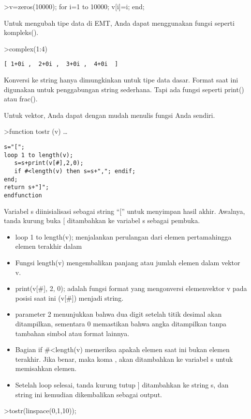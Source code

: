 \documentclass[
]{book}
\begin{document}
\textgreater v=zeros(10000); for i=1 to 10000; v{[}i{]}=i; end;

Untuk mengubah tipe data di EMT, Anda dapat menggunakan fungsi seperti kompleks().

\textgreater complex(1:4)

\begin{verbatim}
[ 1+0i ,  2+0i ,  3+0i ,  4+0i  ]
\end{verbatim}

Konversi ke string hanya dimungkinkan untuk tipe data dasar. Format saat ini digunakan untuk penggabungan string sederhana. Tapi ada fungsi seperti print() atau frac().

Untuk vektor, Anda dapat dengan mudah menulis fungsi Anda sendiri.

\textgreater function tostr (v) \ldots{}

\begin{verbatim}
s="[";
loop 1 to length(v);
   s=s+print(v[#],2,0);
   if #<length(v) then s=s+","; endif;
end;
return s+"]";
endfunction
\end{verbatim}

Variabel s diinisialisasi sebagai string ``{[}'' untuk menyimpan hasil akhir. Awalnya, tanda kurung buka {[} ditambahkan ke variabel s sebagai pembuka.

\begin{itemize}
\item
  loop 1 to length(v); menjalankan perulangan dari elemen pertamahingga elemen terakhir dalam
\item
  Fungsi length(v) mengembalikan panjang atau jumlah elemen dalam vektor v.
\item
  print(v{[}\#{]}, 2, 0); adalah fungsi format yang mengonversi elemenvektor v pada posisi saat ini (v{[}\#{]}) menjadi string.
\item
  parameter 2 menunjukkan bahwa dua digit setelah titik desimal akan ditampilkan, sementara 0 memastikan bahwa angka ditampilkan tanpa tambahan simbol atau format lainnya.
\item
  Bagian if \#\textless length(v) memeriksa apakah elemen saat ini bukan elemen terakhir. Jika benar, maka koma , akan ditambahkan ke variabel s untuk memisahkan elemen.
\item
  Setelah loop selesai, tanda kurung tutup {]} ditambahkan ke string s, dan string ini kemudian dikembalikan sebagai output.
\end{itemize}

\textgreater tostr(linspace(0,1,10));
\end{document}
